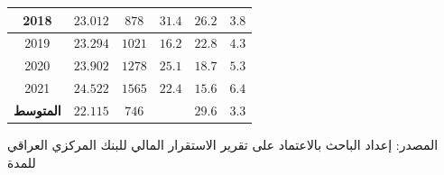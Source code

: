 \documentclass[10pt,a4paper]{report}
\begin{document}
\begin{doublespacing}
\begin{table}[H]
{\begin{tabular}{|c|c|c|c|c|c|}
	2018             & \( 23.012 \)                                                                                  & \( 878 \)                                                                              & \( 31.4 \)             & \( 26.2 \)                                                                                               & \( 3.8 \)                                                                                            \\ \hline
	2019             & \( 23.294 \)                                                                                  & \( 1021 \)                                                                             & \( 16.2 \)             & \( 22.8 \)                                                                                               & \( 4.3 \)                                                                                            \\ \hline
	2020             & \( 23.902 \)                                                                                  & \( 1278 \)                                                                             & \( 25.1 \)             & \( 18.7 \)                                                                                               & \( 5.3 \)                                                                                            \\ \hline
	2021             & \( 24.522 \)                                                                                  & \( 1565 \)                                                                             & \( 22.4 \)             & \( 15.6 \)                                                                                               & \( 6.4 \)                                                                                            \\ \hline
	\textbf{المتوسط} & \textbf{\( 22.115 \)}                                                                         & \textbf{\( 746 \)}                                                                     &                        & \textbf{\( 29.6 \)}                                                                                      & \textbf{\( 3.3 \)}                                                                                   \\ \hline
\end{tabular}%
}
\end{table}
المصدر: إعداد الباحث بالاعتماد على تقرير الاستقرار المالي للبنك المركزي العراقي للمدة 


\end{doublespacing}
\end{document}
